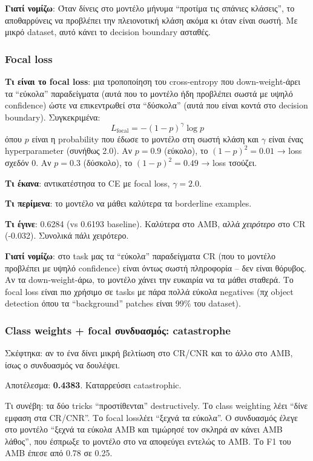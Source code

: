 \documentclass[12pt]{fphw}
\begin{document}
\textbf{Γιατί νομίζω}: Όταν δίνεις στο μοντέλο μήνυμα ``προτίμα τις σπάνιες κλάσεις'', το αποθαρρύνεις να προβλέπει την πλειονοτική κλάση ακόμα κι όταν είναι σωστή. Με μικρό dataset, αυτό κάνει το decision boundary ασταθές.

\subsubsection{Focal loss}

\textbf{Τι είναι το focal loss}: μια τροποποίηση του cross-entropy που down-weight-άρει τα ``εύκολα'' παραδείγματα (αυτά που το μοντέλο ήδη προβλέπει σωστά με υψηλό confidence) ώστε να επικεντρωθεί στα ``δύσκολα'' (αυτά που είναι κοντά στο decision boundary). Συγκεκριμένα:
\[
L_{\text{focal}} = -(1-p)^\gamma \log p
\]
όπου $p$ είναι η probability που έδωσε το μοντέλο στη σωστή κλάση και $\gamma$ είναι ένας hyperparameter (συνήθως 2.0). Αν $p=0.9$ (εύκολο), το $(1-p)^2 = 0.01$ → loss σχεδόν 0. Αν $p=0.3$ (δύσκολο), το $(1-p)^2 = 0.49$ → loss τσούζει.

\textbf{Τι έκανα}: αντικατέστησα το CE με focal loss, $\gamma=2.0$.

\textbf{Τι περίμενα}: το μοντέλο να μάθει καλύτερα τα borderline examples.

\textbf{Τι έγινε}: 0.6284 (vs 0.6193 baseline). Καλύτερα στο AMB, αλλά \emph{χειρότερο} στο CR (-0.032). Συνολικά πάλι χειρότερο.

\textbf{Γιατί νομίζω}: στο task μας τα ``εύκολα'' παραδείγματα CR (που το μοντέλο προβλέπει με υψηλό confidence) είναι όντως σωστή πληροφορία -- δεν είναι θόρυβος. Αν τα down-weight-άρω, το μοντέλο χάνει την ευκαιρία να τα μάθει σταθερά. Το focal loss είναι πιο χρήσιμο σε tasks με πάρα πολλά εύκολα negatives (πχ object detection όπου τα ``background'' patches είναι 99\% του dataset).

\subsubsection{Class weights + focal συνδυασμός: catastrophe}

Σκέφτηκα: αν το ένα δίνει μικρή βελτίωση στο CR/CNR και το άλλο στο AMB, ίσως ο συνδυασμός να δουλέψει.

Αποτέλεσμα: \textbf{0.4383}. Καταρρεύσει catastrophic.

Τι συνέβη: τα δύο tricks ``προστίθενται'' destructively. Το class weighting λέει ``δίνε εμφαση στα CR/CNR''. Το focal lossλέει ``ξεχνά τα εύκολα''. Ο συνδυασμός έλεγε στο μοντέλο ``ξεχνά τα εύκολα AMB και τιμώρησέ τον σκληρά αν κάνει AMB λάθος'', που έσπρωξε το μοντέλο στο να αποφεύγει εντελώς το AMB. Το F1 του AMB έπεσε από 0.78 σε 0.25.
\end{document}
